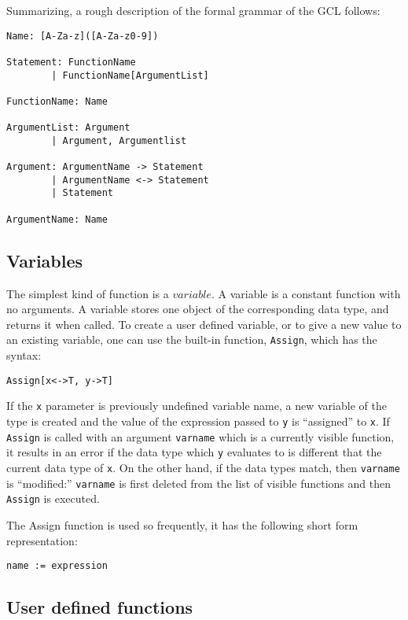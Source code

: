 Summarizing, a rough description of the formal grammar of the GCL
follows:

\begin{verbatim}
Name: [A-Za-z]([A-Za-z0-9])

Statement: FunctionName
        | FunctionName[ArgumentList]

FunctionName: Name

ArgumentList: Argument
        | Argument, Argumentlist

Argument: ArgumentName -> Statement
        | ArgumentName <-> Statement
        | Statement

ArgumentName: Name
\end{verbatim}

\subsection{Variables}

The simplest kind of function is a $variable$.  A variable is a
constant function with no arguments.  A variable stores one object of
the corresponding data type, and returns it when called.  To create a
user defined variable, or to give a new value to an existing variable,
one can use the built-in function,
\verb+Assign+, which has the syntax:
\begin{verbatim}
Assign[x<->T, y->T]
\end{verbatim}

If the \verb+x+ parameter is previously undefined variable name, a new
variable of the type is created and the value of the expression passed
to \verb+y+ is ``assigned'' to \verb+x+.  If \verb+Assign+ is called with
an argument \verb+varname+ which is a currently visible function, it results
in an error if the data type which \verb+y+ evaluates to is different that the
current data type of \verb+x+.  On the other hand, if the
data types match, then \verb+varname+ is ``modified:'' \verb+varname+
is first deleted from the list of visible functions and then
\verb+Assign+ is executed.  

The Assign function is used so frequently, it has the following short form
representation:
\begin{verbatim}
name := expression
\end{verbatim}

\subsection{User defined functions}

